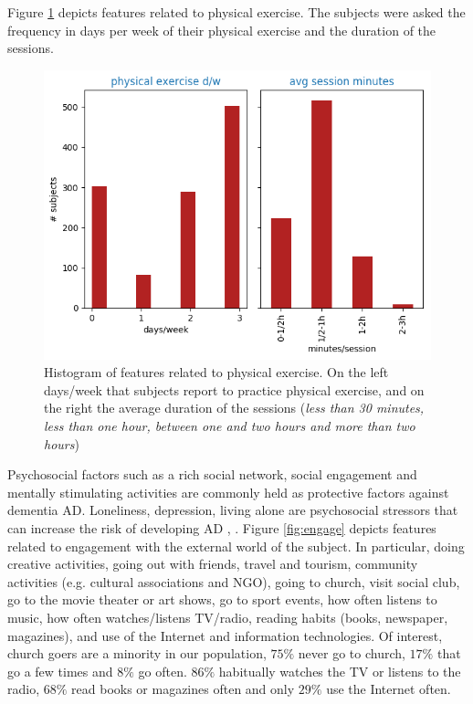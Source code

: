 \documentclass[11pt]{article}
\theoremstyle{definition}
\theoremstyle{remark}
\begin{document}
Figure \ref{fig:phys} depicts features related to physical exercise. The subjects were asked the frequency in days per week of their physical exercise and the duration of the sessions.
\begin{figure}[H]
        \centering
        \includegraphics[keepaspectratio, width=0.6\linewidth]{figures/Fig_phys}
        \caption{Histogram of features related to physical exercise. On the left days/week that subjects report to practice physical exercise, and on the right the average duration of the sessions (\emph{less than 30 minutes, less than one hour, between one and two hours and more than two hours})} 
        \label{fig:phys}
\end{figure}


Psychosocial factors such as a rich social network, social engagement and mentally stimulating activities are commonly held as protective factors against dementia AD. Loneliness, depression, living alone are psychosocial stressors that can increase the risk of developing AD \cite{johansson2013common}, \cite{sindi2015advances}. Figure \ref{fig:engage} depicts features related to engagement with the external world of the subject. In particular, doing creative activities, going out with friends, travel and tourism, community activities (e.g. cultural associations and NGO), going to church, visit social club, go to the movie theater or art shows, go to sport events, how often listens to music, how often watches/listens TV/radio, reading habits (books, newspaper, magazines), and use of the Internet and information technologies.
Of interest, church goers are a minority in our population, $75\%$ never go to church, $17\%$ that go a few times and $8\%$ go often. $86\%$ habitually watches the TV or listens to the radio, $68\%$ read books or magazines often and only $29\%$ use the Internet often.
\end{document}
